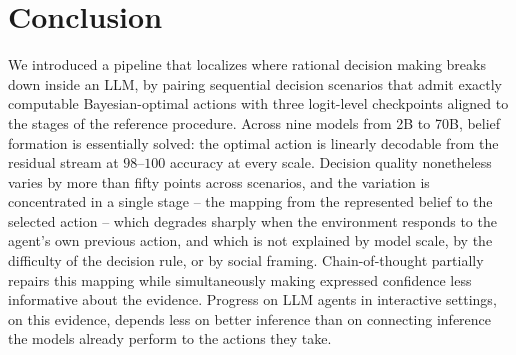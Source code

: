\section{Conclusion}

We introduced a pipeline that localizes where rational decision making breaks
down inside an LLM, by pairing sequential decision scenarios that admit exactly
computable Bayesian-optimal actions with three logit-level checkpoints aligned
to the stages of the reference procedure. Across nine models from 2B to 70B,
belief formation is essentially solved: the optimal action is linearly
decodable from the residual stream at $98$--$100$ accuracy at every scale.
Decision quality nonetheless varies by more than fifty points across scenarios,
and the variation is concentrated in a single stage -- the mapping from the
represented belief to the selected action -- which degrades sharply when the
environment responds to the agent's own previous action, and which is not
explained by model scale, by the difficulty of the decision rule, or by social
framing. Chain-of-thought partially repairs this mapping while simultaneously
making expressed confidence less informative about the evidence. Progress on
LLM agents in interactive settings, on this evidence, depends less on better
inference than on connecting inference the models already perform to the
actions they take.

